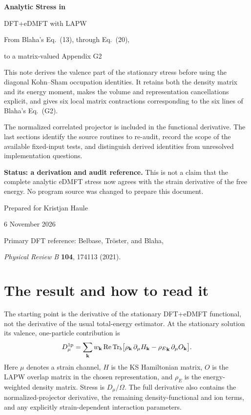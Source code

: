\documentclass[11pt]{article}
\newcommand{\Tr}{\operatorname{Tr}}
\newcommand{\Rea}{\operatorname{Re}}
\newcommand{\kb}{\mathbf k}
\newcommand{\pa}{\partial_\mu}
\newcommand{\rE}{{\rho_E}}
\newcommand{\newpart}[1]{\par\Needspace{12\baselineskip}\section{#1}}
\begin{document}
\hypersetup{pageanchor=false}
\begin{titlepage}
\centering
\vspace*{18mm}
{\Huge\bfseries\color{navy}Analytic Stress in\par DFT+eDMFT with LAPW\par}
\vspace{9mm}
{\LARGE From Blaha's Eq.\ (13), through Eq.\ (20),\par to a matrix-valued Appendix G2\par}
\vspace{16mm}
\begin{minipage}{0.88\linewidth}
This note derives the valence part of the stationary stress before using the
diagonal Kohn--Sham occupation identities. It retains both the density matrix
and its energy moment, makes the volume and representation cancellations
explicit, and gives six local matrix contractions corresponding to the six
lines of Blaha's Eq.\ (G2).

The normalized correlated projector is included in the functional derivative.
The last sections identify the source routines to re-audit, record the scope
of the available fixed-input tests, and distinguish derived identities from
unresolved implementation questions.

\textbf{Status: a derivation and audit reference.} This is not a claim that
the complete analytic eDMFT stress now agrees with the strain derivative of
the free energy. No program source was changed to prepare this document.
\end{minipage}
\vfill
{\large Prepared for Kristjan Haule\par}
\vspace{3mm}
{\large 6 November 2026\par}
\vspace{9mm}
{\small Primary DFT reference: Belbase, Tr\"oster, and Blaha,\par
\emph{Physical Review B} \textbf{104}, 174113 (2021).\par}
\end{titlepage}
\hypersetup{pageanchor=true}
\tableofcontents
\clearpage{}

\newpart{The result and how to read it}
\label{sec:overview}
The starting point is the derivative of the stationary DFT+eDMFT functional,
not the derivative of the usual total-energy estimator. At the stationary
solution its valence, one-particle contribution is
\begin{equation}
 D_\mu^{\rm 1p}=\sum_\kb w_\kb\Rea\Tr_b
 \bigl[\rho_\kb\,\pa H_\kb-\rE_\kb\,\pa O_\kb\bigr].
 \label{eq:target}
\end{equation}
Here $\mu$ denotes a strain channel, $H$ is the KS Hamiltonian matrix,
$O$ is the LAPW overlap matrix in the chosen representation, and $\rho_E$
is the energy-weighted density matrix. Stress is $D_\mu/\Omega$.
The full derivative also contains the normalized-projector derivative,
the remaining density-functional and ion terms, and any explicitly
strain-dependent interaction parameters.
\end{document}
